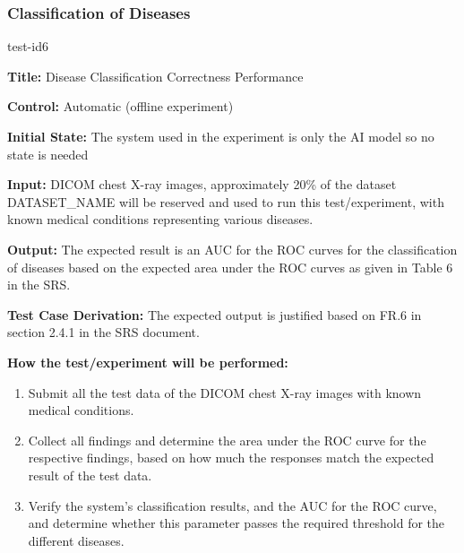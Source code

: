 \documentclass[12pt, titlepage]{article}
\begin{document}
\subsubsection{Classification of Diseases}
\label{sec4.1.3}
\begin{itemize}
    \begin{item}
        test-id6
        \begin{mdframed}[linewidth=0.5mm]
            \textbf{Title:} Disease Classification Correctness Performance \par
            \textbf{Control:} Automatic (offline experiment) \par
            \textbf{Initial State:} The system used in the experiment is only the AI model so no state is needed \par
            \textbf{Input:} DICOM chest X-ray images, approximately 20\% of the dataset DATASET\_NAME will be reserved and used to run this test/experiment, with known medical conditions representing various diseases. \par
            \textbf{Output:} The expected result is an AUC for the ROC curves for the classification of diseases based on the expected area under the ROC curves as given in Table 6 in the SRS. \par
            \textbf{Test Case Derivation:} The expected output is justified based on FR.6 in section 2.4.1 in the SRS document. \par
            \textbf{How the test/experiment will be performed:}
            \begin{enumerate}[noitemsep]
                \item Submit all the test data of the DICOM chest X-ray images with known medical conditions.
                \item Collect all findings and determine the area under the ROC curve for the respective findings, based on how much the responses match the expected result of the test data.
                \item Verify the system's classification results, and the AUC for the ROC curve, and determine whether this parameter passes the required threshold for the different diseases.
            \end{enumerate}
        \end{mdframed}
    \end{item}
\end{itemize}
\end{document}
